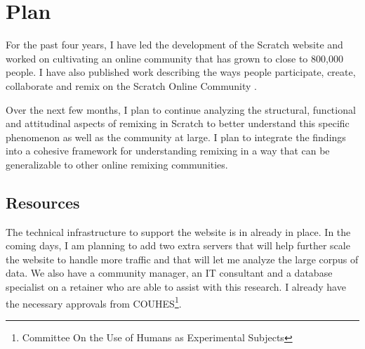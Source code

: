\section{Plan}

For the past four years, I have led the development of the Scratch website and worked on cultivating an online community that has grown to close to 800,000 people.
I have also published work describing the ways people participate, create, collaborate and remix on the Scratch Online Community \citep{monroy-hernandez_scratchr:_2007, monroy-hernandez_empowering_2008, monroy-hernandez_computers_2011, hill_responses_2010, aragon_tale_2009, nickerson_appropriation_2011, brennan_making_2010}.

Over the next few months, I plan to continue analyzing the structural, functional and attitudinal aspects of remixing in Scratch to better understand this specific phenomenon as well as the community at large.
I plan to integrate the findings into a cohesive framework for understanding remixing in a way that can be generalizable to other online remixing communities.

\subsection{Resources}
The technical infrastructure to support the website is in already in place.
In the coming days, I am planning to add two extra servers that will help further scale the website to handle more traffic and that will let me analyze the large corpus of data.
We also have a community manager, an IT consultant and a database specialist on a retainer who are able to assist with this research.
I already have the necessary approvals from COUHES\footnote{Committee On the Use of Humans as Experimental Subjects}.

